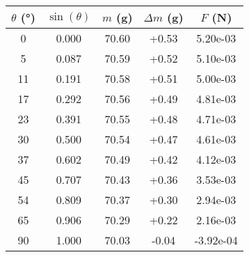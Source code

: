 \begin{tabular}{ccccc}
\toprule
$\theta$ (°) & $\sin(\theta)$ & $m$ (g) & $\Delta m$ (g) & $F$ (N) \\
\midrule
0 & 0.000 & 70.60 & +0.53 & 5.20e-03 \\
5 & 0.087 & 70.59 & +0.52 & 5.10e-03 \\
11 & 0.191 & 70.58 & +0.51 & 5.00e-03 \\
17 & 0.292 & 70.56 & +0.49 & 4.81e-03 \\
23 & 0.391 & 70.55 & +0.48 & 4.71e-03 \\
30 & 0.500 & 70.54 & +0.47 & 4.61e-03 \\
37 & 0.602 & 70.49 & +0.42 & 4.12e-03 \\
45 & 0.707 & 70.43 & +0.36 & 3.53e-03 \\
54 & 0.809 & 70.37 & +0.30 & 2.94e-03 \\
65 & 0.906 & 70.29 & +0.22 & 2.16e-03 \\
90 & 1.000 & 70.03 & -0.04 & -3.92e-04 \\
\bottomrule
\end{tabular}